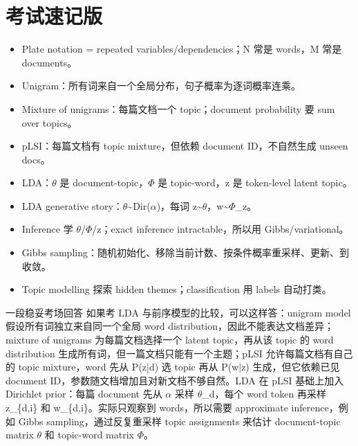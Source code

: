 \documentclass[11pt,a4paper]{ctexart}
\begin{document}
\section{考试速记版}
\begin{itemize}
\item Plate notation = repeated variables/dependencies；N 常是 words，M 常是 documents。
\item Unigram：所有词来自一个全局分布，句子概率为逐词概率连乘。
\item Mixture of unigrams：每篇文档一个 topic；document probability 要 sum over topics。
\item pLSI：每篇文档有 topic mixture，但依赖 document ID，不自然生成 unseen docs。
\item LDA：\(\theta\) 是 document-topic，\(\Phi\) 是 topic-word，z 是 token-level latent topic。
\item LDA generative story：\(\theta\)\textasciitilde{}Dir(\(\alpha\))，每词 z\textasciitilde{}\(\theta\)，w\textasciitilde{}\(\Phi\)\_z。
\item Inference 学 \(\theta\)/\(\Phi\)/z；exact inference intractable，所以用 Gibbs/variational。
\item Gibbs sampling：随机初始化、移除当前计数、按条件概率重采样、更新、到收敛。
\item Topic modelling 探索 hidden themes；classification 用 labels 自动打类。
\end{itemize}
\begin{callout}{一段稳妥考场回答}
如果考 LDA 与前序模型的比较，可以这样答：unigram model 假设所有词独立来自同一个全局 word distribution，因此不能表达文档差异；mixture of unigrams 为每篇文档选择一个 latent topic，再从该 topic 的 word distribution 生成所有词，但一篇文档只能有一个主题；pLSI 允许每篇文档有自己的 topic mixture，word 先从 P(z|d) 选 topic 再从 P(w|z) 生成，但它依赖已见 document ID，参数随文档增加且对新文档不够自然。LDA 在 pLSI 基础上加入 Dirichlet prior：每篇 document 先从 \(\alpha\) 采样 \(\theta\)\_d，每个 word token 再采样 z\_\{d,i\} 和 w\_\{d,i\}。实际只观察到 words，所以需要 approximate inference，例如 Gibbs sampling，通过反复重采样 topic assignments 来估计 document-topic matrix \(\theta\) 和 topic-word matrix \(\Phi\)。
\end{callout}
\end{document}
